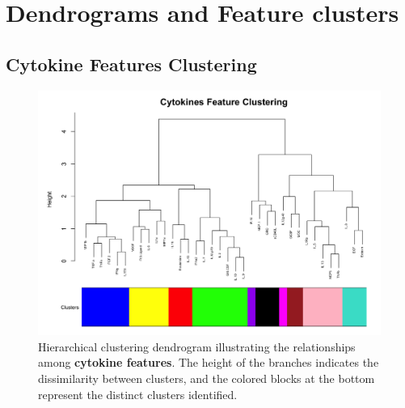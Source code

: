 \documentclass[12pt,a4paper]{report}
\begin{document}
\appendix

\chapter{Dendrograms and Feature clusters}
\label{chap:dendrograms_and_feature_interpretations}

\section{Cytokine Features Clustering}

\begin{figure}[H]
    \centering
    \includegraphics[width=\linewidth]{images/Cytokines_features_clustering_cut_colors.png}
    \caption[Cytokine features clustering dendrogram]{Hierarchical clustering dendrogram illustrating the relationships among \textbf{cytokine features}. The height of the branches indicates the dissimilarity between clusters, and the colored blocks at the bottom represent the distinct clusters identified.}
    \label{fig:Cytokines_features_clustering_cut_colors}
\end{figure}
\end{document}
